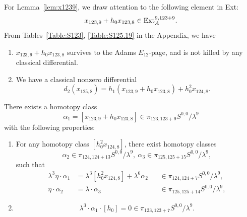 \documentclass{amsart}
\numberwithin{equation}{section}
\begin{document}
For Lemma~\ref{lem:x1239}, we draw attention to the following element in Ext:
$$x_{123,9}+h_0x_{123,8} \in \mathrm{Ext}_A^{9, 123+9}.$$
From Tables~\ref{Table:S123}, \ref{Table:S125.19} in the Appendix, we have
\begin{fact} \label{fact:x1239}
    \begin{enumerate}

   \item  $x_{123,9}+h_0x_{123,8}$ survives to the Adams $E_{12}$-page, and is not killed by any classical differential.
    \item We have a classical nonzero differential 
    $$d_2 (x_{125,8}) = h_1 (x_{123,9}+h_0x_{123,8}) + h_0^2x_{124,8}.$$
   \end{enumerate}
\end{fact}

\begin{lemma} \label{lem:x1239}
    There exists a homotopy class 
    $$\alpha_1 = [x_{123,9}+h_0x_{123,8}] \in \pi_{123,123+9} S^{0,0}/\lambda^9$$
    with the following properties:
    \begin{enumerate}
    \item For any homotopy class $[h_0^2 x_{124,8}]$, there exist homotopy classes 
    $$\alpha_2 \in \pi_{124,124+13} S^{0,0}/\lambda^9, \ \alpha_3 \in \pi_{125,125+15} S^{0,0}/\lambda^9,$$ 
    such that 
    \begin{align*}
        \lambda^3 \eta \cdot \alpha_1 & = \lambda^3 [h_0^2 x_{124,8}] + 
\lambda^6 \alpha_2 && \in \pi_{124,124+7} S^{0,0}/\lambda^9,\\
\eta \cdot \alpha_2 & = \lambda \cdot \alpha_3 && \in \pi_{125,125+14} S^{0,0}/\lambda^9,
    \end{align*}
\item \leavevmode\vspace*{-\dimexpr\abovedisplayskip + \baselineskip} 
$$\lambda^3 \cdot \alpha_1 \cdot [h_0] = 0 \in \pi_{123,123+7} S^{0,0}/\lambda^9.$$
    \end{enumerate}
\end{lemma}
\end{document}
